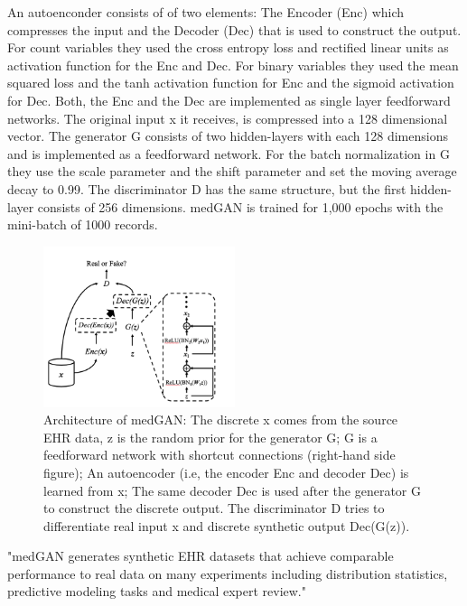 \documentclass[11pt, a4paper]{book}
\begin{document}
An autoenconder consists of of two elements: The Encoder (Enc) which compresses the input and the Decoder (Dec) that is used to construct the output.
For count variables they used the cross entropy loss and rectified linear units  as activation function for the Enc and Dec.
For binary variables they used the mean squared loss and the tanh activation function for Enc and the sigmoid activation for Dec.
Both, the Enc and the Dec are implemented as single layer feedforward networks. The original input x it receives, is compressed into a 128 dimensional vector. The generator G consists of two hidden-layers with each 128 dimensions and is implemented as a feedforward network. For the batch normalization in G they use the scale parameter  \gamma and the shift parameter \beta and set the moving average decay to 0.99. The discriminator D has the same structure, but the first hidden-layer consists of 256 dimensions. medGAN is trained for 1,000 epochs with the mini-batch of 1000 records. \citep{Choi2017}


\begin{figure}
  \begin{center}
  \includegraphics[width=0.5\textwidth]{img/medgan-architecture.png}
  \caption{Architecture of medGAN: The discrete x comes from the source EHR data, z is the random prior for the generator G; G is a feedforward network with shortcut connections (right-hand side figure); An autoencoder (i.e, the encoder Enc and decoder Dec) is learned from x; The same decoder Dec is used after the generator G to construct the discrete output. The discriminator D tries to differentiate real input x and discrete synthetic output Dec(G(z)).  \citep{Choi2017}}
  \label{fig:transfer_learning_no}
  \end{center}
\end{figure}

"medGAN generates synthetic EHR datasets that achieve comparable performance to real data on many experiments including distribution statistics, predictive modeling tasks and medical expert review."
\end{document}
